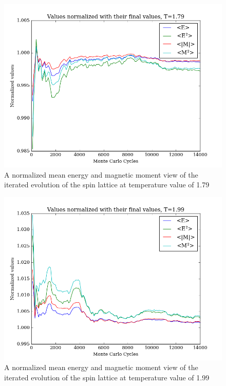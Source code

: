\documentclass[11pt,a4paper,notitlepage,twocolumn]{article}
\begin{document}
\begin{figure}
[H]\center
\includegraphics[scale=0.35]{../figs/4c/Prob_L20_mc100000_T179_spinrandom.png}
\caption{A normalized mean energy and magnetic moment view of the iterated evolution of the spin lattice at temperature value of 1.79}
\end{figure}
\begin{figure}
[H]\center
\includegraphics[scale=0.35]{../figs/4c/Prob_L20_mc100000_T199_spinrandom.png}
\caption{A normalized mean energy and magnetic moment view of the iterated evolution of the spin lattice at temperature value of 1.99}
\end{figure}
\end{document}
